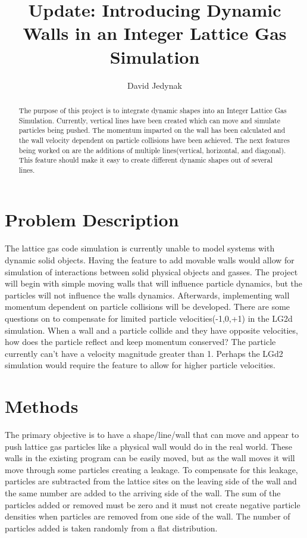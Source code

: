 \documentclass{article}
\begin{document}
\lstset{language=C} 
\title{Update: Introducing Dynamic Walls in an Integer Lattice Gas Simulation}
\author{David Jedynak}
\maketitle
\begin{abstract}
The purpose of this project is to integrate dynamic shapes into an Integer Lattice Gas Simulation. Currently, vertical lines have been created which can move and simulate particles being pushed. The momentum imparted on the wall has been calculated and the wall velocity dependent on particle collisions have been achieved. The next features being worked on are the additions of multiple lines(vertical, horizontal, and diagonal). This feature should make it easy to create different dynamic shapes out of several lines.   
\end{abstract}
\section{Problem Description}
The lattice gas code simulation is currently unable to model systems with dynamic solid objects. Having the feature to add movable walls would allow for simulation of interactions between solid physical objects and gasses. The project will begin with simple moving walls that will influence particle dynamics, but the particles will not influence the walls dynamics. Afterwards, implementing wall momentum dependent on particle collisions will be developed. There are some questions on to compensate for limited particle velocities(-1,0,+1) in the LG2d simulation. When a wall and a particle collide and they have opposite velocities, how does the particle reflect and keep momentum conserved? The particle currently can't have a velocity magnitude greater than 1. Perhaps the LGd2 simulation would require the feature to allow for higher particle velocities.
\section{Methods}
The primary objective is to have a shape/line/wall that can move and appear to push lattice gas particles like a physical wall would do in the real world. These walls in the existing program can be easily moved, but as the wall moves it will move through some particles creating a leakage. To compensate for this leakage, particles are subtracted from the lattice sites on the leaving side of the wall and the same number are added to the arriving side of the wall. The sum of the particles added or removed must be zero and it must not create negative particle densities when particles are removed from one side of the wall. The number of particles added is taken randomly from a flat distribution. 
\end{document}
